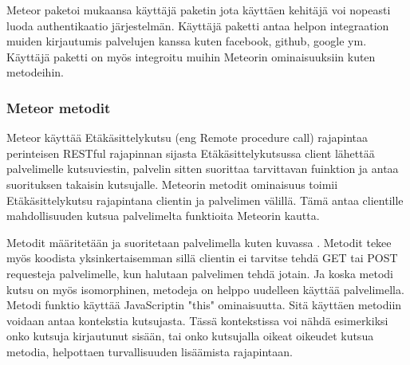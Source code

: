 \documentclass[11pt,a4paper,titlepage,oneside]{article}
\begin{document}
Meteor paketoi mukaansa käyttäjä paketin jota käyttäen kehitäjä voi nopeasti luoda authentikaatio järjestelmän.
Käyttäjä paketti antaa helpon integraation muiden kirjautumis palvelujen kanssa kuten facebook, github, google ym.
Käyttäjä paketti on myös integroitu muihin Meteorin ominaisuuksiin kuten metodeihin. 



\subsubsection{Meteor metodit}








Meteor käyttää Etäkäsittelykutsu (eng Remote procedure call) rajapintaa perinteisen RESTful rajapinnan sijasta 
Etäkäsittelykutsussa client lähettää palvelimelle kutsuviestin, 
palvelin sitten suorittaa tarvittavan fuinktion ja antaa suorituksen takaisin kutsujalle.\citemissing %
Meteorin metodit ominaisuus toimii Etäkäsittelykutsu rajapintana clientin ja palvelimen välillä. 
Tämä antaa clientille mahdollisuuden kutsua palvelimelta funktioita Meteorin kautta.
\medskip



Metodit määritetään ja suoritetaan palvelimella kuten kuvassa \nextImageCount.
Metodit tekee myös koodista yksinkertaisemman sillä clientin ei tarvitse tehdä GET tai POST requesteja palvelimelle, kun halutaan palvelimen tehdä jotain. 
Ja koska metodi kutsu on myös isomorphinen, metodeja on helppo uudelleen käyttää palvelimella.
Metodi funktio käyttää JavaScriptin "this"{} ominaisuutta. 
Sitä käyttäen metodiin voidaan antaa kontekstia kutsujasta.
Tässä kontekstissa voi nähdä esimerkiksi onko kutsuja kirjautunut sisään, tai onko kutsujalla oikeat oikeudet kutsua metodia, 
helpottaen turvallisuuden lisäämista rajapintaan.
\bigskip
\end{document}

